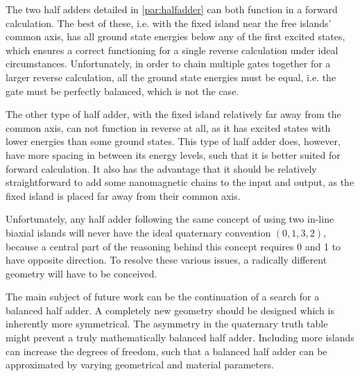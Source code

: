 \documentclass[11pt,a4paper,english]{article}
\begin{document}
The two half adders detailed in \cref{par:halfadder} can both function in a forward calculation. The best of these, i.e. with the fixed island near the free islands' common axis, has all ground state energies below any of the first excited states, which ensures a correct functioning for a single reverse calculation under ideal circumstances. Unfortunately, in order to chain multiple gates together for a larger reverse calculation, all the ground state energies must be equal, i.e. the gate must be perfectly balanced, which is not the case. \par
The other type of half adder, with the fixed island relatively far away from the common axis, can not function in reverse at all, as it has excited states with lower energies than some ground states. This type of half adder does, however, have more spacing in between its energy levels, such that it is better suited for forward calculation. It also has the advantage that it should be relatively straightforward to add some nanomagnetic chains to the input and output, as the fixed island is placed far away from their common axis. \par
Unfortunately, any half adder following the same concept of using two in-line biaxial islands will never have the ideal quaternary convention $(0,1,3,2)$, because a central part of the reasoning behind this concept requires 0 and 1 to have opposite direction. To resolve these various issues, a radically different geometry will have to be conceived. \par
The main subject of future work can be the continuation of a search for a balanced half adder. A completely new geometry should be designed which is inherently more symmetrical. The asymmetry in the quaternary truth table might prevent a truly mathematically balanced half adder. Including more islands can increase the degrees of freedom, such that a balanced half adder can be approximated by varying geometrical and material parameters.


\newpage


\end{document}
